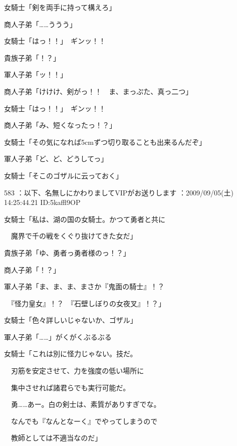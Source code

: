 \documentclass[a4j,twocolumn]{tarticle}
\begin{document}
女騎士「剣を両手に持って構えろ」\par{} 
商人子弟「……ううう」 



女騎士「はっ！！」　ギンッ！！ 



貴族子弟「！？」\par{} 
軍人子弟「ッ！！」\par{} 
商人子弟「けけけ、剣がっ！！　ま、まっぷた、真っ二つ」 



女騎士「はっ！！」　ギンッ！！\par{} 
商人子弟「み、短くなったっ！？」 



女騎士「その気になれば5cmずつ切り取ることも出来るんだぞ」 



軍人子弟「ど、ど、どうしてっ」 



女騎士「そこのゴザルに云っておく」 

	
    
    

583 ：以下、名無しにかわりましてVIPがお送りします ：2009/09/05(土) 14:25:44.21 ID:5kaffl9OP 


女騎士「私は、湖の国の女騎士。かつて勇者と共に\par{} 
　魔界で千の戦をくぐり抜けてきた女だ」 



貴族子弟「ゆ、勇者っ勇者様のっ！？」\par{} 
商人子弟「！？」\par{} 
軍人子弟「ま、ま、ま、まさか『鬼面の騎士』！？\par{} 
　『怪力皇女』！？　『石壁しぼりの女夜叉』！？」 



女騎士「色々詳しいじゃないか、ゴザル」 



軍人子弟「……」がくがくぶるぶる 



女騎士「これは別に怪力じゃない。技だ。\par{} 
　刃筋を安定させて、力を強度の低い場所に\par{} 
　集中させれば諸君らでも実行可能だ。\par{} 
　勇……あー。白の剣士は、素質がありすぎでな。\par{} 
　なんでも『なんとなーく』でやってしまうので\par{} 
　教師としては不適当なのだ」 
\end{document}
